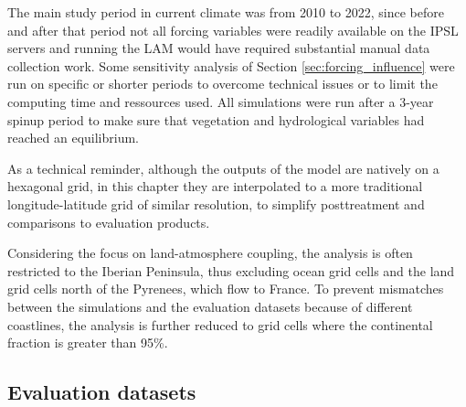 The main study period in current climate was from 2010 to 2022, since before and after that period not all forcing variables were readily available on the IPSL servers and running the LAM would have required substantial manual data collection work. Some sensitivity analysis of Section \ref{sec:forcing_influence} were run on specific or shorter periods to overcome technical issues or to limit the computing time and ressources used. All simulations were run after a 3-year spinup period to make sure that vegetation and hydrological variables had reached an equilibrium.

As a technical reminder, although the outputs of the model are natively on a hexagonal grid, in this chapter they are interpolated to a more traditional longitude-latitude grid of similar resolution, to simplify posttreatment and comparisons to evaluation products.

Considering the focus on land-atmosphere coupling, the analysis is often restricted to the Iberian Peninsula, thus excluding ocean grid cells and the land grid cells north of the Pyrenees, which flow to France. To prevent mismatches between the simulations and the evaluation datasets because of different coastlines, the analysis is further reduced to grid cells where the continental fraction is greater than 95\%. 

\subsection{Evaluation datasets}
\begin{table}[h]
    \caption{Gridded datasets used for evaluation.}
    \label{tab:obs-datasets}
\end{table}

